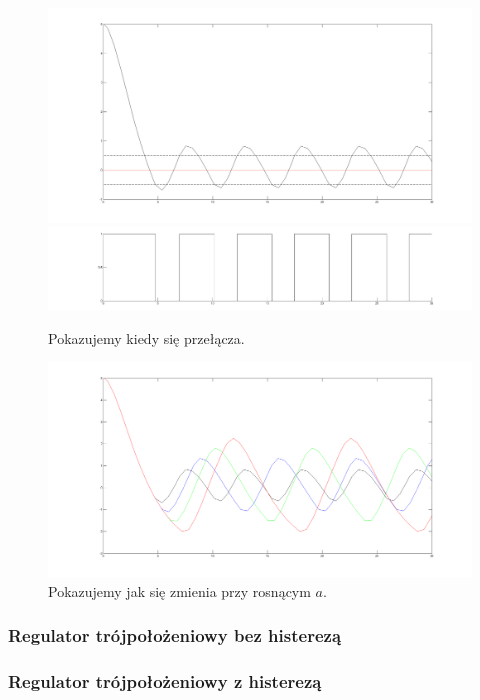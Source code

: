 \documentclass[a4paper,10pt]{article}
\begin{document}
\begin{figure}[!h]
    \centering
	\includegraphics[width=120mm]{CW3-dwupolozeniowy-e-a05.png}
	\includegraphics[width=120mm]{CW3-dwupolozeniowy-u-a05.png}
	\caption{Pokazujemy kiedy się przełącza.}
    \label{fig:Rysunek}
\end{figure}

\begin{figure}[!h]
    \centering
	\includegraphics[width=120mm]{CW3-dwupolozeniowy-e.png}
	\caption{Pokazujemy jak się zmienia przy rosnącym $a$.}
    \label{fig:Rysunek}
\end{figure}

\subsubsection{Regulator trójpołożeniowy bez histerezą}\label{sec:r3bh}

\subsubsection{Regulator trójpołożeniowy z histerezą}\label{sec:r3h}
\end{document}

